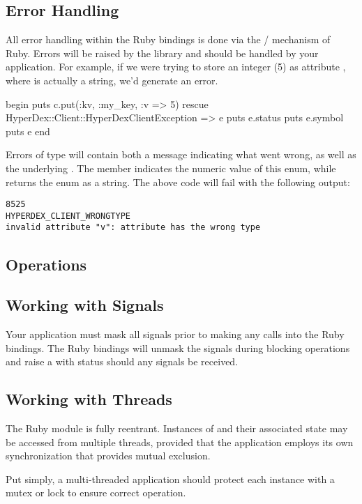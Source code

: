 \subsection{Error Handling}
\label{sec:api:ruby:error-handling}

All error handling within the Ruby bindings is done via the
/ mechanism of Ruby.  Errors will be raised by the
library and should be handled by your application.  For example, if we were
trying to store an integer (5) as attribute , where  is
actually a string, we'd generate an error.

\begin{rubycode}
begin
    puts c.put(:kv, :my_key, {:v => 5})
rescue HyperDex::Client::HyperDexClientException => e
    puts e.status
    puts e.symbol
    puts e
end
\end{rubycode}

Errors of type  will contain both a message
indicating what went wrong, as well as the underlying .  The member  indicates the numeric
value of this enum, while  returns the enum as a string.  The above
code will fail with the following output:

\begin{verbatim}
8525
HYPERDEX_CLIENT_WRONGTYPE
invalid attribute "v": attribute has the wrong type
\end{verbatim}

\subsection{Operations}
\label{sec:api:ruby:ops}



\subsection{Working with Signals}
\label{sec:api:ruby:signals}

Your application must mask all signals prior to making any calls into the
Ruby bindings.  The Ruby bindings will unmask the signals during blocking
operations and raise a  with status
 should any signals be received.

\subsection{Working with Threads}
\label{sec:api:ruby:threads}

The Ruby module is fully reentrant.  Instances of
 and their associated state may be accessed from
multiple threads, provided that the application employs its own synchronization
that provides mutual exclusion.

Put simply, a multi-threaded application should protect each 
instance with a mutex or lock to ensure correct operation.
